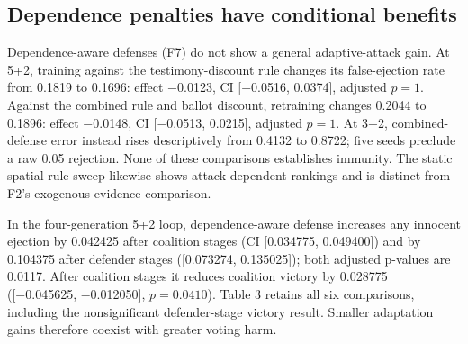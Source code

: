 \documentclass[
  12pt,
]{article}
\begin{document}
\FloatBarrier

\subsection{Dependence penalties have conditional
benefits}\label{dependence-penalties-have-conditional-benefits}

Dependence-aware defenses (F7) do not show a general adaptive-attack
gain. At 5+2, training against the testimony-discount rule changes its
false-ejection rate from 0.1819 to 0.1696: effect −0.0123, CI
{[}−0.0516, 0.0374{]}, adjusted \(p=1\). Against the combined rule and
ballot discount, retraining changes 0.2044 to 0.1896: effect −0.0148, CI
{[}−0.0513, 0.0215{]}, adjusted \(p=1\). At 3+2, combined-defense error
instead rises descriptively from 0.4132 to 0.8722; five seeds preclude a
raw 0.05 rejection. None of these comparisons establishes immunity. The
static spatial rule sweep likewise shows attack-dependent rankings and
is distinct from F2's exogenous-evidence comparison.

In the four-generation 5+2 loop, dependence-aware defense increases any
innocent ejection by 0.042425 after coalition stages (CI {[}0.034775,
0.049400{]}) and by 0.104375 after defender stages ({[}0.073274,
0.135025{]}); both adjusted p-values are 0.0117. After coalition stages
it reduces coalition victory by 0.028775 ({[}−0.045625, −0.012050{]},
\(p=0.0410\)). Table 3 retains all six comparisons, including the
nonsignificant defender-stage victory result. Smaller adaptation gains
therefore coexist with greater voting harm.

\FloatBarrier
\end{document}
